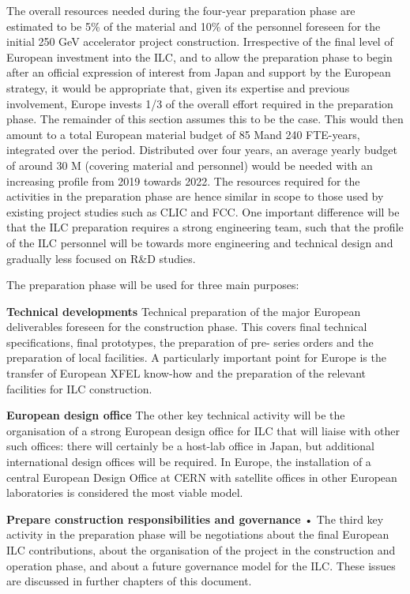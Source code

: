 \documentclass[%
 reprint,
 amsmath,amssymb,
 aps,
]{revtex4-1}
\begin{document}
The overall resources needed during the four-year preparation phase are estimated to be 5\% of the material and 10\% of the personnel foreseen for the initial 250 GeV accelerator project construction. Irrespective of the final level of European investment into the ILC, and to allow the preparation phase to begin after an official expression of interest from Japan and support by the European strategy, it would be appropriate that, given its expertise and previous involvement, Europe invests 1/3 of the overall effort required in the preparation phase. The remainder of this section assumes this to be the case. This would then amount to a total European material budget of 85 M\Euro and 240 FTE-years, integrated over the period.
Distributed over four years, an average yearly budget of around 30 M\Euro{} (covering material and personnel) would be needed with an increasing profile from 2019 towards 2022. The resources required for the activities in the preparation phase are hence similar in scope to those used by existing project studies such as CLIC and FCC. One important difference will be that the ILC preparation requires a strong engineering team, such that the profile of the ILC personnel will be towards more engineering and technical design and gradually less focused on R&D studies.

The preparation phase will be used for three main purposes:

\begin{description}

\item{\bfseries Technical developments}
Technical preparation of the major European deliverables foreseen for the construction phase. This covers final technical specifications, final prototypes, the preparation of pre- series orders and the preparation of local facilities. A particularly important point for Europe is the transfer of European XFEL know-how and the preparation of the relevant facilities for ILC construction.
\item{\bfseries European design office}
The other key technical activity will be the organisation of a strong European design office for ILC that will liaise with other such offices: there will certainly be a host-lab office in Japan, but additional international design offices will be required. In Europe, the installation of a central European Design Office at CERN with satellite offices in other European laboratories is considered the most viable model.
\item{\bfseries Prepare construction responsibilities and governance}
• The third key activity in the preparation phase will be negotiations about the final European ILC contributions, about the organisation of the project in the construction and operation phase, and about a future governance model for the ILC. These issues are discussed in further chapters of this document.
\end{description}
\end{document}
